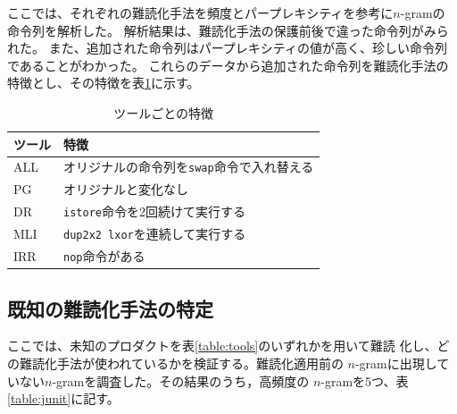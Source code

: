 \documentclass[a4j,fleqn,10pt]{jarticle}
\begin{document}


ここでは、それぞれの難読化手法を頻度とパープレキシティを参考に$n$-gramの命令列を解析した。
解析結果は、難読化手法の保護前後で違った命令列がみられた。
また、追加された命令列はパープレキシティの値が高く、珍しい命令列であることがわかった。
これらのデータから追加された命令列を難読化手法の特徴とし、その特徴を表\ref{table:features}に示す。

\begin{table}[t]
  \centering
  \footnotesize{
    \caption{ツールごとの特徴}\label{table:features}
  \begin{tabular}{l|l}
    ツール              & 特徴　\\ \hline
    ALL & オリジナルの命令列を\texttt{swap}命令で入れ替える \\
    PG  & オリジナルと変化なし \\
    DR  & \texttt{istore}命令を2回続けて実行する \\
    MLI & \texttt{dup2x2 lxor}を連続して実行する \\
    IRR & \texttt{nop}命令がある \\
  \end{tabular}}
\end{table}

\subsection{既知の難読化手法の特定}

ここでは、未知のプロダクトを表\ref{table:tools}のいずれかを用いて難読
化し、どの難読化手法が使われているかを検証する。難読化適用前の
$n$-gramに出現していない$n$-gramを調査した。その結果のうち，高頻度の
$n$-gramを5つ、表\ref{table:junit}に記す。
\end{document}
